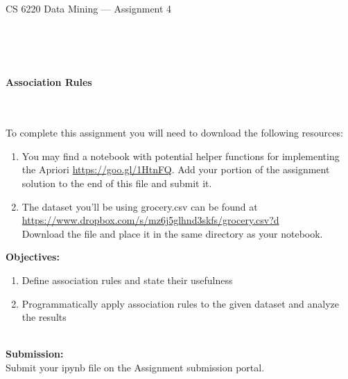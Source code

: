 \documentclass[letter-paper,12pt]{article} %
\begin{document}

\begin{center}
\begin{Large}
CS 6220 Data Mining --- Assignment 4
\end{Large}
\end{center}

\hline
\hline
~\\~\\~\\

\begin{center}
\begin{Large}
\textbf{Association Rules}
\end{Large}
\end{center}
~\\~\\


To complete this assignment you will need to download the following resources:

\begin{enumerate}
    \item You may find a notebook with potential helper functions for implementing the Apriori \url{https://goo.gl/1HtnFQ}. Add your portion of the assignment solution to the end of this file and submit it.
    \item The dataset you’ll be using grocery.csv can be found at \\ \url{https://www.dropbox.com/s/mz6j5glhnd3skfs/grocery.csv?d}\\ Download the file and place it in the same directory as your notebook.
\end{enumerate}


\textbf{Objectives:}
\begin{enumerate}
\item Define association rules and state their usefulness
\item Programmatically apply association rules to the given dataset and analyze the results
\end{enumerate}
~\\
\textbf{Submission:}\\

Submit your ipynb file on the Assignment submission portal. \\~\\
\end{document}

